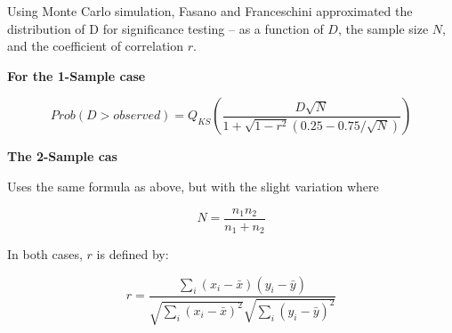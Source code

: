 \documentclass[codesnippet]{jss}
\begin{document}
Using Monte Carlo simulation, Fasano and Franceschini approximated the distribution of D for significance testing -- as a function of $D$, the sample size $N$, and the coefficient of correlation $r$.

\textbf{For the 1-Sample case}

\begin{equation} \label{eq:4}
Prob(D > observed) = Q_{KS} ( \frac{D\sqrt{N}}{1+\sqrt{1-r^2}(0.25-0.75/\sqrt{N})})
\end{equation}

\textbf{The 2-Sample cas}

Uses the same formula as above, but with the slight variation where

\begin{equation} \label{eq:5}
N = \frac{n_1n_2}{n_1+n_2}
\end{equation}

In both cases, $r$ is defined by:

\begin{equation} \label{eq:6}
r = \frac{\sum_{i}^{}(x_i-\bar{x})(y_i-\bar{y})}{\sqrt{\sum_{i}^{}(x_i-\bar{x})^2}\sqrt{\sum_{i}^{}(y_i-\bar{y})^2}}
\end{equation}
\end{document}
